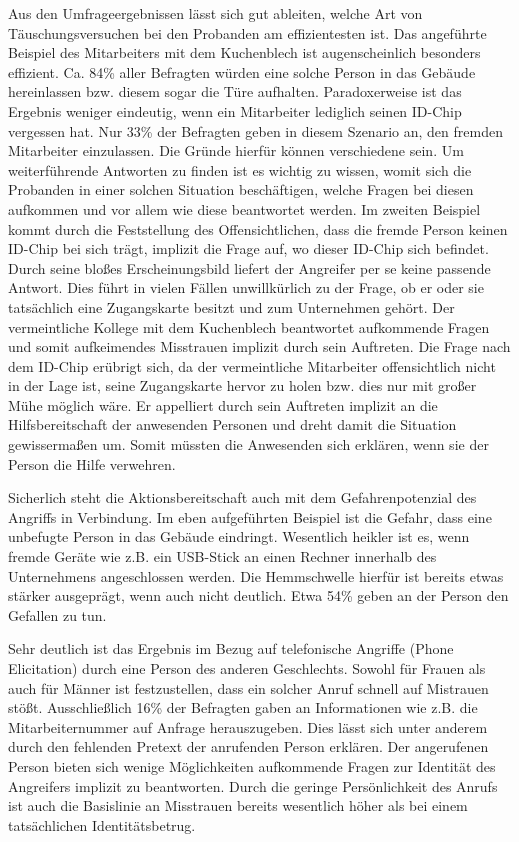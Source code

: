 Aus den Umfrageergebnissen lässt sich gut ableiten, welche Art von Täuschungsversuchen bei den Probanden am effizientesten ist.
Das angeführte Beispiel des Mitarbeiters mit dem Kuchenblech ist augenscheinlich besonders effizient.
Ca. 84\% aller Befragten würden eine solche Person in das Gebäude hereinlassen bzw. diesem sogar die Türe aufhalten.
Paradoxerweise ist das Ergebnis weniger eindeutig, wenn ein Mitarbeiter lediglich seinen ID-Chip vergessen hat.
Nur 33\% der Befragten geben in diesem Szenario an, den fremden Mitarbeiter einzulassen.
Die Gründe hierfür können verschiedene sein.
Um weiterführende Antworten zu finden ist es wichtig zu wissen, womit sich die Probanden in einer solchen Situation beschäftigen, welche Fragen bei diesen aufkommen und vor allem wie diese beantwortet werden.
Im zweiten Beispiel kommt durch die Feststellung des Offensichtlichen, dass die fremde Person keinen ID-Chip bei sich trägt, implizit die Frage auf, wo dieser ID-Chip sich befindet.
Durch seine bloßes Erscheinungsbild liefert der Angreifer per se keine passende Antwort.
Dies führt in vielen Fällen unwillkürlich zu der Frage, ob er oder sie tatsächlich eine Zugangskarte besitzt und zum Unternehmen gehört.
Der vermeintliche Kollege mit dem Kuchenblech beantwortet aufkommende Fragen und somit aufkeimendes Misstrauen implizit durch sein Auftreten.
Die Frage nach dem ID-Chip erübrigt sich, da der vermeintliche Mitarbeiter offensichtlich nicht in der Lage ist, seine Zugangskarte hervor zu holen bzw. dies nur mit großer Mühe möglich wäre.
Er appelliert durch sein Auftreten implizit an die Hilfsbereitschaft der anwesenden Personen und dreht damit die Situation gewissermaßen um.
Somit müssten die Anwesenden sich erklären, wenn sie der Person die Hilfe verwehren.

Sicherlich steht die Aktionsbereitschaft auch mit dem Gefahrenpotenzial des Angriffs in Verbindung.
Im eben aufgeführten Beispiel ist die Gefahr, dass eine unbefugte Person in das Gebäude eindringt.
Wesentlich heikler ist es, wenn fremde Geräte wie z.B. ein USB-Stick an einen Rechner innerhalb des Unternehmens angeschlossen werden.
Die Hemmschwelle hierfür ist bereits etwas stärker ausgeprägt, wenn auch nicht deutlich.
Etwa 54\% geben an der Person den Gefallen zu tun.

Sehr deutlich ist das Ergebnis im Bezug auf telefonische Angriffe (Phone Elicitation) durch eine Person des anderen Geschlechts.
Sowohl für Frauen als auch für Männer ist festzustellen, dass ein solcher Anruf schnell auf Mistrauen stößt.
Ausschließlich 16\% der Befragten gaben an Informationen wie z.B. die Mitarbeiternummer auf Anfrage herauszugeben.
Dies lässt sich unter anderem durch den fehlenden Pretext der anrufenden Person erklären.
Der angerufenen Person bieten sich wenige Möglichkeiten aufkommende Fragen zur Identität des Angreifers implizit zu beantworten.
Durch die geringe Persönlichkeit des Anrufs ist auch die Basislinie an Misstrauen bereits wesentlich höher als bei einem tatsächlichen Identitätsbetrug.

